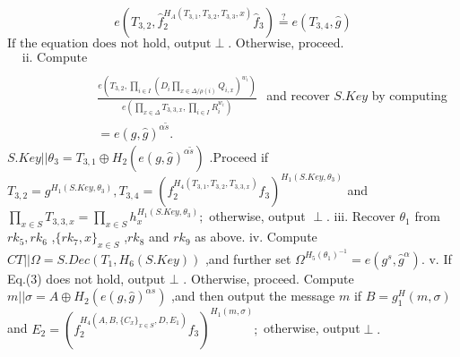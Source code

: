 \documentclass[runningheads]{llncs}
\begin{document}
\begin{equation}
e(T_{3,2}, \hat{f}_2^{H_A(T_{3,1},T_{3,2},T_{3,3},x)} \hat{f}_3) \stackrel{?}{=} e(T_{3,4},\hat{g})
\end{equation}
$\text{If the equation does not hold, output}\perp.\text{ Otherwise, proceed.}$
$\begin{aligned}&\text{ii. Compute}\\\\&&\frac{e\left(T_{3,2},\prod_{i\in I}\left(D_i\prod_{x\in\Delta/\rho(i)}Q_{i,x}\right)^{w_i}\right)}{e\left(\prod_{x\in\Delta}T_{3,3,x},\prod_{i\in I}R_i^{w_i}\right)}\\&&=e(g,\hat{g})^{\alpha\tilde{s}}.\end{aligned}$
and recover $S.Key$ by computing $S.Key||\theta_3=T_{3,1}\oplus H_2(e(g,\hat{g})^{\alpha\tilde{s}})$ .Proceed if
$T_{3,2}=g^{H_1(S.Key,\theta_3)},T_{3,4}=(f_2^{H_4(T_{3,1},T_{3,2},T_{3,3,x})}f_3)^{H_1(S.Key,\theta_3)}$ and $\prod_{x\in S}T_{3,3,x}=\prod_{x\in S}h_x^{H_1(S.Key,\theta_3)};$
otherwise, output $\perp.$
iii. Recover $\theta _1$ from $rk_5,rk_6$ ,$\{rk_7,x\}_{x\in S}$ ,$rk_8$ and $rk_9$ as above.
iv. Compute $CT||\Omega=S.Dec(T_1,H_6(S.Key))$ ,and further set $\Omega^{H_5(\theta_1)^{-1}}=e(g^s,\hat{g}^\alpha).$
v. If Eq.(3) does not hold, output $\bot$ . Otherwise, proceed. Compute $m||\sigma=A\oplus H_2(e(g,\hat{g})^{\alpha s})$ ,and then output the message $m$ if $B=g^H_1(m,\sigma)$ and $E_2=(f_2^{H_4(A,B,\{C_x\}_{x\in S},D,E_1)}f_3)^{H_1(m,\sigma)};$ otherwise, output$\perp.$
\end{document}
